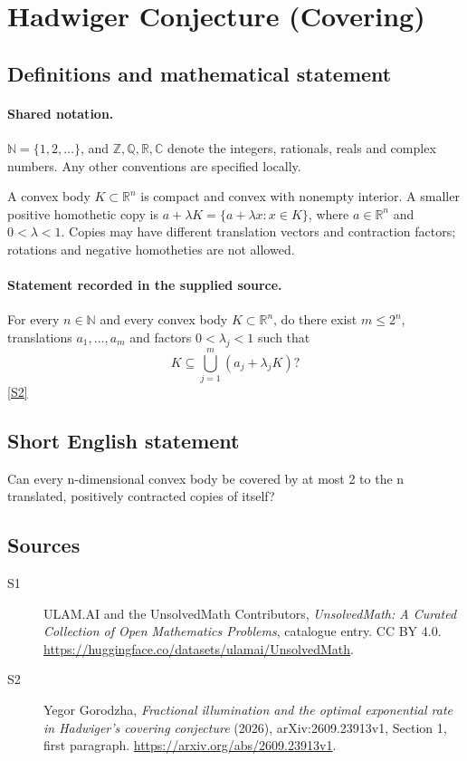 \documentclass[11pt]{article}
\newcommand{\sref}[2]{\hyperlink{source:#1:#2}{[S#2]}}
\begin{document}
\section{Hadwiger Conjecture (Covering)}\label{statement}

\subsection{Definitions and mathematical statement}

\paragraph{Shared notation.}$\mathbb N=\{1,2,\ldots\}$, and $\mathbb Z,\mathbb Q,\mathbb R,\mathbb C$ denote the integers, rationals, reals and complex numbers. Any other conventions are specified locally.


A convex body $K\subset\mathbb R^n$ is compact and convex with nonempty interior. A smaller positive homothetic copy is $a+\lambda K=\{a+\lambda x:x\in K\}$, where $a\in\mathbb R^n$ and $0<\lambda<1$. Copies may have different translation vectors and contraction factors; rotations and negative homotheties are not allowed.
\paragraph{Statement recorded in the supplied source.}
For every $n\in\mathbb N$ and every convex body $K\subset\mathbb R^n$, do there exist $m\le2^n$, translations $a_1,\ldots,a_m$ and factors $0<\lambda_j<1$ such that
\[
 K\subseteq\bigcup_{j=1}^{m}(a_j+\lambda_jK)?
\]
\sref{statement}{2}
\subsection{Short English statement}
Can every n-dimensional convex body be covered by at most 2 to the n translated, positively contracted copies of itself?
\subsection{Sources}
\begin{description}
\item[\hypertarget{source:statement:1}{S1}] ULAM.AI and the UnsolvedMath Contributors, \emph{UnsolvedMath: A Curated Collection of Open Mathematics Problems}, catalogue entry. CC BY 4.0. \url{https://huggingface.co/datasets/ulamai/UnsolvedMath}.
\item[\hypertarget{source:statement:2}{S2}] Yegor Gorodzha, \emph{Fractional illumination and the optimal exponential rate in Hadwiger's covering conjecture} (2026), arXiv:2609.23913v1, Section 1, first paragraph. \url{https://arxiv.org/abs/2609.23913v1}.
\end{description}
\label{end:statement}
\end{document}
